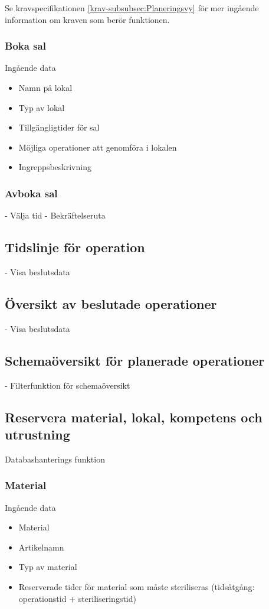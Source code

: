 \documentclass[a4paper,10pt]{article}
\begin{document}
Se kravspecifikationen \ref{krav-subsubsec:Planeringsvy} för mer ingående information om kraven som berör funktionen.

    \subsubsection{Boka sal}


Ingående data
\begin{multicols}{2}
\begin{itemize}
	\item Namn på lokal
	\item Typ av lokal
	\item Tillgängligtider för sal
	\item Möjliga operationer att genomföra i lokalen
	\item Ingreppsbeskrivning
\end{itemize}
\end{multicols}

\subsubsection{Avboka sal}
-	Välja tid
-	Bekräftelseruta

\subsection{Tidslinje för operation}
-	Visa beslutsdata

\subsection{Översikt av beslutade operationer}
-	Visa beslutsdata
\subsection{Schemaöversikt för planerade operationer}
-	Filterfunktion för schemaöversikt

\subsection{Reservera material, lokal, kompetens och utrustning}
Databashanterings funktion

\subsubsection{Material}
Ingående data
\begin{itemize}
	\item Material
	\item Artikelnamn
	\item Typ av material
	\item Reserverade tider för material som måste steriliseras (tidsåtgång: operationstid + steriliseringstid)
\end{itemize}
\end{document}
